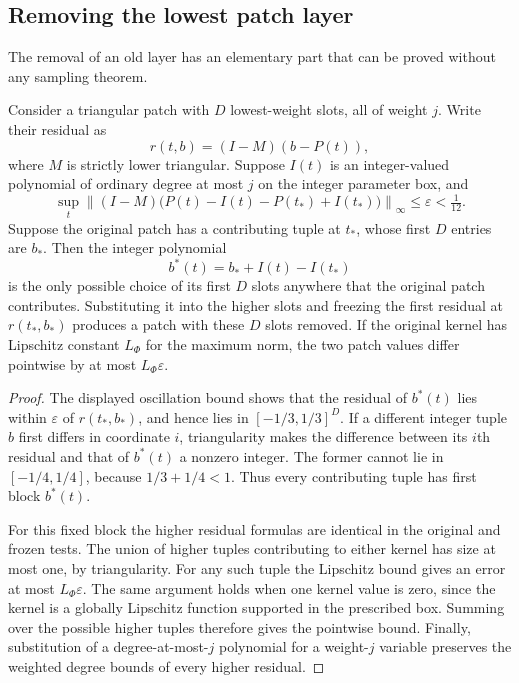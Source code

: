 \subsection{Removing the lowest patch layer}

The removal of an old layer has an elementary part that can be proved
without any sampling theorem.

\begin{lemma}
\label{lifting:freeze-layer}
Consider a triangular patch with $D$ lowest-weight slots, all of
weight $j$.  Write their residual as
\[
                  r(t,b)=(I-M)(b-P(t)),
\]
where $M$ is strictly lower triangular.  Suppose $I(t)$ is an
integer-valued polynomial of ordinary degree at most $j$ on the
integer parameter box, and
\[
 \sup_t\left\|(I-M)\bigl(P(t)-I(t)-P(t_*)+I(t_*)\bigr)\right\|_\infty
       \le\varepsilon<\tfrac1{12}.
\]
Suppose the original patch has a contributing tuple at $t_*$, whose
first $D$ entries are $b_*$.  Then the integer polynomial
\[
                        b^*(t)=b_*+I(t)-I(t_*)
\]
is the only possible choice of its first $D$ slots anywhere that the
original patch contributes.  Substituting it into the higher slots
and freezing the first residual at $r(t_*,b_*)$ produces a patch with
these $D$ slots removed.  If the original kernel has Lipschitz
constant $L_\Phi$ for the maximum norm, the two patch values differ
pointwise by at most $L_\Phi\varepsilon$.
\end{lemma}

\begin{proof}
The displayed oscillation bound shows that the residual of $b^*(t)$
lies within $\varepsilon$ of $r(t_*,b_*)$, and hence lies in
$[-1/3,1/3]^D$.  If a different integer tuple $b$ first differs in
coordinate $i$, triangularity makes the difference between its
$i$th residual and that of $b^*(t)$ a nonzero integer.  The former
cannot lie in $[-1/4,1/4]$, because $1/3+1/4<1$.
Thus every contributing tuple has first block $b^*(t)$.

For this fixed block the higher residual formulas are identical in
the original and frozen tests.  The union of higher tuples contributing
to either kernel has size at most one, by triangularity.  For any such tuple the Lipschitz
bound gives an error at most $L_\Phi\varepsilon$.  The same argument
holds when one kernel value is zero, since the kernel is a globally
Lipschitz function supported in the prescribed box.  Summing over
the possible higher tuples therefore gives the pointwise bound.
Finally, substitution of a degree-at-most-$j$ polynomial for a
weight-$j$ variable preserves the weighted degree bounds of every
higher residual.
\end{proof}

